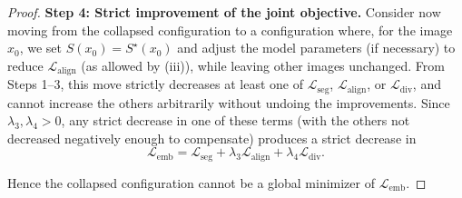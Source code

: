 \documentclass[12pt]{article}
\begin{document}
\begin{proof}
\medskip
\noindent\textbf{Step 4: Strict improvement of the joint objective.}
Consider now moving from the collapsed configuration to a configuration where,
for the image $x_0$, we set $S(x_0) = S^\star(x_0)$ and adjust the model
parameters (if necessary) to reduce $\mathcal{L}_{\mathrm{align}}$ (as allowed
by (iii)), while leaving other images unchanged.
From Steps 1–3, this move strictly decreases at least one of
$\mathcal{L}_{\mathrm{seg}}$, $\mathcal{L}_{\mathrm{align}}$, or
$\mathcal{L}_{\mathrm{div}}$, and cannot increase the others arbitrarily
without undoing the improvements.
Since $\lambda_3,\lambda_4 > 0$, any strict decrease in one of these terms
(with the others not decreased negatively enough to compensate) produces a
strict decrease in
\[
\mathcal{L}_{\mathrm{emb}}
= \mathcal{L}_{\mathrm{seg}}
+ \lambda_3 \mathcal{L}_{\mathrm{align}}
+ \lambda_4 \mathcal{L}_{\mathrm{div}}.
\]

Hence the collapsed configuration cannot be a global minimizer of
$\mathcal{L}_{\mathrm{emb}}$.
\end{proof}
\end{document}
